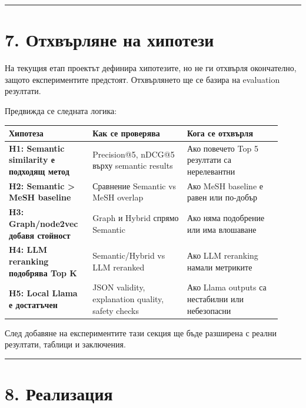 \documentclass[12pt,a4paper]{article}
\begin{document}
\vspace{0.5em}\hrule\vspace{1.0em}

\section{7. Отхвърляне на хипотези}\label{ux43eux442ux445ux432ux44aux440ux43bux44fux43dux435-ux43dux430-ux445ux438ux43fux43eux442ux435ux437ux438}

На текущия етап проектът дефинира хипотезите, но не ги отхвърля окончателно, защото експериментите предстоят. Отхвърлянето ще се базира на evaluation резултати.

Предвижда се следната логика:

\begin{longtable}{@{}
  >{\raggedright\arraybackslash}p{0.28\linewidth}
  >{\raggedright\arraybackslash}p{0.32\linewidth}
  >{\raggedright\arraybackslash}p{0.32\linewidth}@{}}
\toprule
\textbf{Хипотеза} & \textbf{Как се проверява} & \textbf{Кога се отхвърля} \\
\midrule
\endhead
\bottomrule
\endlastfoot
\textbf{H1: Semantic similarity е подходящ метод} & Precision@5, nDCG@5 върху semantic results & Ако повечето Top 5 резултати са нерелевантни \\
\textbf{H2: Semantic > MeSH baseline} & Сравнение Semantic vs MeSH overlap & Ако MeSH baseline е равен или по-добър \\
\textbf{H3: Graph/node2vec добавя стойност} & Graph и Hybrid спрямо Semantic & Ако няма подобрение или има влошаване \\
\textbf{H4: LLM reranking подобрява Top K} & Semantic/Hybrid vs LLM reranked & Ако LLM reranking намали метриките \\
\textbf{H5: Local Llama е достатъчен} & JSON validity, explanation quality, safety checks & Ако Llama outputs са нестабилни или небезопасни \\
\end{longtable}

След добавяне на експериментите тази секция ще бъде разширена с реални резултати, таблици и заключения.

\vspace{0.5em}\hrule\vspace{1.0em}

\section{8. Реализация}\label{ux440ux435ux430ux43bux438ux437ux430ux446ux438ux44f}
\end{document}
